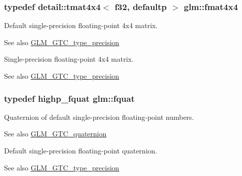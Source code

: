 \subsubsection[{\texorpdfstring{fmat4x4}{fmat4x4}}]{\setlength{\rightskip}{0pt plus 5cm}typedef detail\+::tmat4x4$<$ f32, defaultp $>$ {\bf glm\+::fmat4x4}}\hypertarget{group__gtc__type__precision_gaa641dae0fcc277f028b4e48e16bbea86}{}\label{group__gtc__type__precision_gaa641dae0fcc277f028b4e48e16bbea86}
Default single-\/precision floating-\/point 4x4 matrix. \begin{DoxySeeAlso}{See also}
\hyperlink{group__gtc__type__precision}{G\+L\+M\+\_\+\+G\+T\+C\+\_\+type\+\_\+precision}
\end{DoxySeeAlso}
Single-\/precision floating-\/point 4x4 matrix. \begin{DoxySeeAlso}{See also}
\hyperlink{group__gtc__type__precision}{G\+L\+M\+\_\+\+G\+T\+C\+\_\+type\+\_\+precision} 
\end{DoxySeeAlso}
\subsubsection[{\texorpdfstring{fquat}{fquat}}]{\setlength{\rightskip}{0pt plus 5cm}typedef highp\+\_\+fquat {\bf glm\+::fquat}}\hypertarget{group__gtc__type__precision_gaa95d73f08018f3864c6ae08dbf1c59f2}{}\label{group__gtc__type__precision_gaa95d73f08018f3864c6ae08dbf1c59f2}
Quaternion of default single-\/precision floating-\/point numbers.

\begin{DoxySeeAlso}{See also}
\hyperlink{group__gtc__quaternion}{G\+L\+M\+\_\+\+G\+T\+C\+\_\+quaternion}
\end{DoxySeeAlso}
Default single-\/precision floating-\/point quaternion. \begin{DoxySeeAlso}{See also}
\hyperlink{group__gtc__type__precision}{G\+L\+M\+\_\+\+G\+T\+C\+\_\+type\+\_\+precision} 
\end{DoxySeeAlso}
